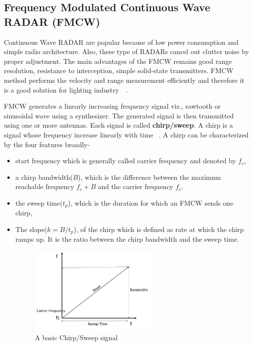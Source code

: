 \subsection{Frequency Modulated Continuous Wave RADAR (FMCW)}

Continuous Wave RADAR are popular because of low power consumption and simple radio architecture. Also, these type of RADARs cancel out clutter noise by proper adjustment. The main advantages of the FMCW remains good range resolution, resistance to interception, simple solid-state transmitters. FMCW method performs the velocity and range measurement efficiently and therefore it is a good solution for lighting industry~\cite{arai2000life}~\cite{li2006experiment}.


FMCW generates a linearly increasing frequency signal viz., sawtooth or sinusoidal wave using a synthesizer. The generated signal is then transmitted using one or more antennas.
Each signal is called \textbf{chirp/sweep}. A chirp is a signal whose frequency increase linearly with time ~\cite{rao_2017}. A chirp can be characterized by the four features broadly-

\begin{itemize}
    \item start frequency which is generally called carrier frequency and denoted by \(f_{c}\),
    \item a chirp bandwidth(\(B\)), which is the difference between the maximum reachable frequency  \(f_{c} + B \)  and the carrier frequency \(f_{c}\).
    \item the sweep time(\(t_{p}\)), which is the duration for which an FMCW sends one chirp,
    \item The slope(\(k= B/t_{p}\)), of the chirp which is defined as rate at which the chirp ramps up. It is the ratio between the chirp bandwidth and the sweep time.
    
 \begin{figure}[ht]
  \begin{center}
    \includegraphics[width=0.60\textwidth]{Master's thesis/images/sweep.jpg} 
    \caption{A basic Chirp/Sweep signal}
    \label{fig:sweep}
  \end{center}
\end{figure}   
\end{itemize}

